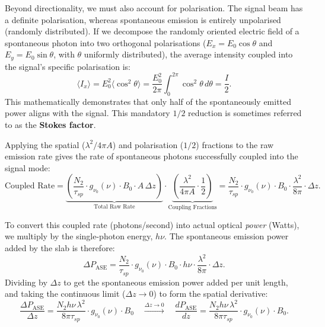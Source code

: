 Beyond directionality, we must also account for polarisation. The signal beam has a definite polarisation, whereas spontaneous emission is entirely unpolarised (randomly distributed). If we decompose the randomly oriented electric field of a spontaneous photon into two orthogonal polarisations ($E_x = E_0\cos\theta$ and $E_y = E_0\sin\theta$, with $\theta$ uniformly distributed), the average intensity coupled into the signal's specific polarisation is:
\begin{equation*}
    \langle I_x \rangle = E_0^2 \langle \cos^2\theta \rangle = \frac{E_0^2}{2\pi}\int_0^{2\pi}\cos^2\theta\,d\theta = \frac{I}{2}.
\end{equation*}
This mathematically demonstrates that only half of the spontaneously emitted power aligns with the signal. This mandatory $1/2$ reduction is sometimes referred to as the \textbf{Stokes factor}.

Applying the spatial ($\lambda^2 / 4\pi A$) and polarisation ($1/2$) fractions to the raw emission rate gives the rate of spontaneous photons successfully coupled into the signal mode:
\begin{equation*}
    \text{Coupled Rate}
    = \underbrace{\left( \frac{N_2}{\tau_{sp}} \cdot g_{\nu_0}(\nu) \cdot B_0 \cdot A\,\Delta z \right)}_{\text{Total Raw Rate}}
    \cdot \underbrace{\left( \frac{\lambda^2}{4\pi A} \cdot \frac{1}{2} \right)}_{\text{Coupling Fractions}}
    = \frac{N_2}{\tau_{sp}} \cdot g_{\nu_0}(\nu) \cdot B_0 \cdot \frac{\lambda^2}{8\pi} \cdot \Delta z.
\end{equation*}

To convert this coupled rate (photons/second) into actual optical \emph{power} (Watts), we multiply by the single-photon energy, $h\nu$. The spontaneous emission power added by the slab is therefore:
\begin{equation*}
    \Delta P_\text{ASE}
    = \frac{N_2}{\tau_{sp}} \cdot g_{\nu_0}(\nu) \cdot B_0 \cdot h\nu
    \cdot \frac{\lambda^2}{8\pi} \cdot \Delta z.
\end{equation*}
Dividing by $\Delta z$ to get the spontaneous emission power added per unit length, and taking the continuous limit ($\Delta z \to 0$) to form the spatial derivative:
\begin{equation*}
    \frac{\Delta P_\text{ASE}}{\Delta z}
    = \frac{N_2 h\nu\,\lambda^2}{8\pi\tau_{sp}} \cdot g_{\nu_0}(\nu) \cdot B_0
    \quad \xrightarrow{\Delta z \to 0} \quad
    \frac{dP_\text{ASE}}{dz}
    = \frac{N_2 h\nu\,\lambda^2}{8\pi\tau_{sp}} \cdot g_{\nu_0}(\nu) \cdot B_0.
\end{equation*}


